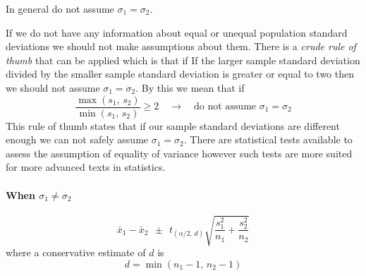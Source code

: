 \begin{termBox}{
In general do not assume $\sigma_{1} = \sigma_{2}$.
}
\end{termBox}

If we do not have any information about equal or unequal population standard deviations we should
not make assumptions about them.
There is a \emph{crude rule of thumb} that can be applied which is that if
If the larger sample standard deviation divided by the smaller sample standard 
deviation is greater or equal to two then we should not assume $\sigma_{1} = \sigma_{2}$.
By this we mean that if
\begin{equation*}
\frac{ \max(s_{1}, \, s_{2}) }{ \min(s_{1}, \, s_{2}) } \geq 2 \quad \to \quad \text{do not assume $\sigma_{1} = \sigma_{2}$}
\end{equation*}
This rule of thumb states that if our sample standard deviations are different enough we can not safely 
assume $\sigma_{1} = \sigma_{2}$.
There are statistical tests available to assess the assumption of equality of variance however such tests are more suited for more advanced texts in statistics.



\paragraph{When $\sigma_{1} \neq \sigma_{2}$}


\begin{termBox}{
\begin{equation}
\bar{x}_{1} - \bar{x}_{2}	~~ \pm ~~		t_{(\alpha / 2, \, d)}  \sqrt{ \frac{s_1^2}{n_1} + \frac{s_2^2}{n_2} }\label{eqnCIDiffMeanSigmasNotKnownAndDifferent}
\end{equation}
where a conservative estimate of $d$ is
\begin{equation}
d = \min(n_1 - 1, \, n_2 - 1)
\end{equation}
}
\end{termBox}

